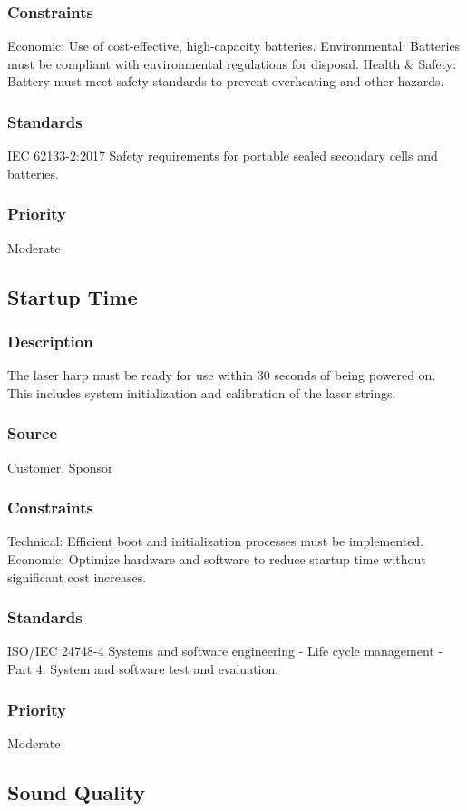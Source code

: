 \subsubsection{Constraints}
Economic: Use of cost-effective, high-capacity batteries.
Environmental: Batteries must be compliant with environmental regulations for disposal.
Health & Safety: Battery must meet safety standards to prevent overheating and other hazards.
\subsubsection{Standards}
IEC 62133-2:2017 Safety requirements for portable sealed secondary cells and batteries.
\subsubsection{Priority}
Moderate


\subsection{Startup Time}
\subsubsection{Description}
The laser harp must be ready for use within 30 seconds of being powered on. This includes system initialization and calibration of the laser strings.
\subsubsection{Source}
Customer, Sponsor
\subsubsection{Constraints}
Technical: Efficient boot and initialization processes must be implemented.
Economic: Optimize hardware and software to reduce startup time without significant cost increases.
\subsubsection{Standards}
ISO/IEC 24748-4 Systems and software engineering - Life cycle management - Part 4: System and software test and evaluation.
\subsubsection{Priority}
Moderate


\subsection{Sound Quality}
